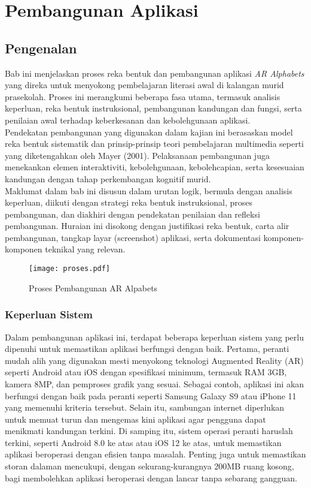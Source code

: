\chapter{Pembangunan Aplikasi}

\section{Pengenalan}
Bab ini menjelaskan proses reka bentuk dan pembangunan aplikasi \textit{AR Alphabets} yang direka untuk menyokong pembelajaran literasi awal di kalangan murid prasekolah. Proses ini merangkumi beberapa fasa utama, termasuk analisis keperluan, reka bentuk instruksional, pembangunan kandungan dan fungsi, serta penilaian awal terhadap keberkesanan dan kebolehgunaan aplikasi.\\

\hspace{1cm} Pendekatan pembangunan yang digunakan dalam kajian ini berasaskan model reka bentuk sistematik dan prinsip-prinsip teori pembelajaran multimedia seperti yang diketengahkan oleh Mayer (2001). Pelaksanaan pembangunan juga menekankan elemen interaktiviti, kebolehgunaan, kebolehcapian, serta kesesuaian kandungan dengan tahap perkembangan kognitif murid.\\

\hspace{1cm} Maklumat dalam bab ini disusun dalam urutan logik, bermula dengan analisis keperluan, diikuti dengan strategi reka bentuk instruksional, proses pembangunan, dan diakhiri dengan pendekatan penilaian dan refleksi pembangunan. Huraian ini disokong dengan justifikasi reka bentuk, carta alir pembangunan, tangkap layar (screenshot) aplikasi, serta dokumentasi komponen-komponen teknikal yang relevan.\\



\begin{figure}
    \centering
    \texttt{[image: proses.pdf]}
    \caption{Proses Pembangunan AR Alpabets}
    \label{fig:enter-label}
\end{figure}
\clearpage
\subsection{Keperluan Sistem} Dalam pembangunan aplikasi ini, terdapat beberapa keperluan sistem yang perlu dipenuhi untuk memastikan aplikasi berfungsi dengan baik. Pertama, peranti mudah alih yang digunakan mesti menyokong teknologi Augmented Reality (AR) seperti Android atau iOS dengan spesifikasi minimum, termasuk RAM 3GB, kamera 8MP, dan pemproses grafik yang sesuai. Sebagai contoh, aplikasi ini akan berfungsi dengan baik pada peranti seperti Samsung Galaxy S9 atau iPhone 11 yang memenuhi kriteria tersebut. Selain itu, sambungan internet diperlukan untuk memuat turun dan mengemas kini aplikasi agar pengguna dapat menikmati kandungan terkini. Di samping itu, sistem operasi peranti haruslah terkini, seperti Android 8.0 ke atas atau iOS 12 ke atas, untuk memastikan aplikasi beroperasi dengan efisien tanpa masalah. Penting juga untuk memastikan storan dalaman mencukupi, dengan sekurang-kurangnya 200MB ruang kosong, bagi membolehkan aplikasi beroperasi dengan lancar tanpa sebarang gangguan.

